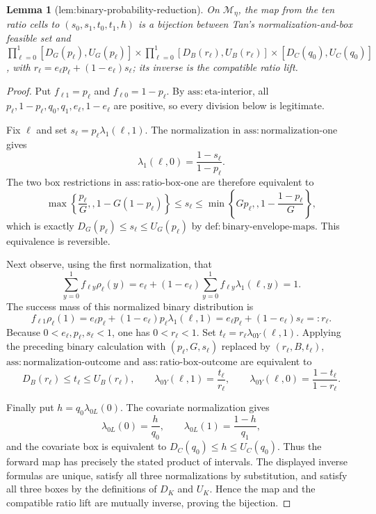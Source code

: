\documentclass{article}
\newtheorem{lemma}{Lemma}
\begin{document}
\begin{lemma}[lem:binary-probability-reduction]\label{lem:binary-probability-reduction}
On \(\mathcal M_\eta\), the map from the ten ratio cells to \((s_0,s_1,t_0,t_1,h)\) is a bijection between Tan's normalization-and-box feasible set and \(\prod_{\ell=0}^1[D_G(p_\ell),U_G(p_\ell)]\times\prod_{\ell=0}^1[D_B(r_\ell),U_B(r_\ell)]\times[D_C(q_0),U_C(q_0)]\), with \(r_\ell=e_\ell p_\ell+(1-e_\ell)s_\ell\); its inverse is the compatible ratio lift.
\end{lemma}
\begin{proof}
Put \(f_{\ell 1}=p_\ell\) and \(f_{\ell0}=1-p_\ell\).  By \(\mathrm{ass{:}eta\text{-}interior}\), all \(p_\ell,1-p_\ell,q_0,q_1,e_\ell,1-e_\ell\) are positive, so every division below is legitimate.

Fix \(\ell\) and set \(s_\ell=p_\ell\lambda _1(\ell,1)\).  The normalization in \(\mathrm{ass{:}normalization\text{-}one}\) gives
\[
 \lambda _1(\ell,0)=\frac{1-s_\ell}{1-p_\ell}.
\]
The two box restrictions in \(\mathrm{ass{:}ratio\text{-}box\text{-}one}\) are therefore equivalent to
\[
 \max\!\left\{\frac{p_\ell}{G},,1-G(1-p_\ell)\right\}
 \leq s_\ell\leq
 \min\!\left\{Gp_\ell,,1-\frac{1-p_\ell}{G}\right\},
\]
which is exactly \(D_G(p_\ell)\leq s_\ell\leq U_G(p_\ell)\) by \(\mathrm{def{:}binary\text{-}envelope\text{-}maps}\).  This equivalence is reversible.

Next observe, using the first normalization, that
\[
 \sum_{y=0}^1 f_{\ell y}\rho_\ell(y)
 =e_\ell+(1-e_\ell)\sum_{y=0}^1f_{\ell y}\lambda _1(\ell,y)=1.
\]
The success mass of this normalized binary distribution is
\[
 f_{\ell1}\rho_\ell(1)
 =e_\ell p_\ell+(1-e_\ell)p_\ell\lambda _1(\ell,1)
 =e_\ell p_\ell+(1-e_\ell)s_\ell=:r_\ell.
\]
Because \(0<e_\ell,p_\ell,s_\ell<1\), one has \(0<r_\ell<1\).  Set \(t_\ell=r_\ell\lambda _{0Y}(\ell,1)\).  Applying the preceding binary calculation with \((p_\ell,G,s_\ell)\) replaced by \((r_\ell,B,t_\ell)\), \(\mathrm{ass{:}normalization\text{-}outcome}\) and \(\mathrm{ass{:}ratio\text{-}box\text{-}outcome}\) are equivalent to
\[
 D_B(r_\ell)\leq t_\ell\leq U_B(r_\ell),\qquad
 \lambda _{0Y}(\ell,1)=\frac{t_\ell}{r_\ell},\qquad
 \lambda _{0Y}(\ell,0)=\frac{1-t_\ell}{1-r_\ell}.
\]

Finally put \(h=q_0\lambda _{0L}(0)\).  The covariate normalization gives
\[
 \lambda _{0L}(0)=\frac h{q_0},\qquad
 \lambda _{0L}(1)=\frac{1-h}{q_1},
\]
and the covariate box is equivalent to \(D_C(q_0)\leq h\leq U_C(q_0)\).  Thus the forward map has precisely the stated product of intervals.  The displayed inverse formulas are unique, satisfy all three normalizations by substitution, and satisfy all three boxes by the definitions of \(D_K\) and \(U_K\).  Hence the map and the compatible ratio lift are mutually inverse, proving the bijection.
\end{proof}
\end{document}

